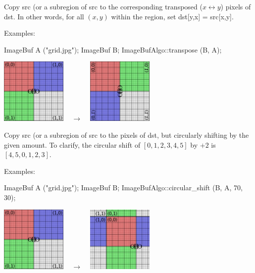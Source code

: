  
Copy {\cf src} (or a subregion of {\cf src} to the corresponding 
transposed ($x \leftrightarrow y$) pixels
of {\cf dst}.  In other words, for all $(x,y)$ within the region,
set {\cf dst[y,x] = src[x,y]}.

\smallskip
\noindent Examples:
\begin{code}
    ImageBuf A ("grid.jpg");
    ImageBuf B;
    ImageBufAlgo::transpose (B, A);
\end{code}
\spc \includegraphics[width=1.25in]{figures/grid-small.jpg}
~ {\Huge $\rightarrow$} ~
\includegraphics[width=1.25in]{figures/transpose.jpg} \\
\apiend


 

Copy {\cf src} (or a subregion of {\cf src} to the pixels of {\cf dst},
but circularly shifting by the given amount.  To clarify, the circular
shift of $[0,1,2,3,4,5]$ by $+2$ is $[4,5,0,1,2,3]$.

\smallskip
\noindent Examples:
\begin{code}
    ImageBuf A ("grid.jpg");
    ImageBuf B;
    ImageBufAlgo::circular_shift (B, A, 70, 30);
\end{code}
\spc \includegraphics[width=1.25in]{figures/grid-small.jpg} 
~ {\Huge $\rightarrow$} ~
\includegraphics[width=1.25in]{figures/cshift.jpg} \\
\apiend



